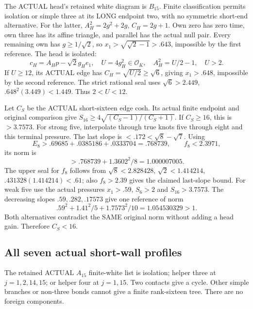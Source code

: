\documentclass[11pt]{article}
\begin{document}
The ACTUAL head's retained white diagram is \(B_{15}\).
Finite classification permits isolation or simple
three at its LONG endpoint two, with no symmetric
short-end alternative.
For the latter,
\(A_H^2=2g^2+2g\), \(C_H=2g+1\).
Own zero has zero time, own three has its affine
triangle, and parallel has the actual null pair.
Every remaining own has \(g\ge1/\sqrt2\), so
\(x_1>\sqrt{\sqrt2-1}>.643\), impossible by the
first reference.
The head is isolated:
\[
 c_H=A_Hp-\sqrt2g_He_1,\quad
 U=4g_H^2\in\mathcal O_K,\quad A_H^2=U/2-1,\quad U>2 .
\]
If \(U\ge12\), its ACTUAL edge has
\(C_H=\sqrt{U/2}\ge\sqrt6\), giving \(x_1>.648\),
impossible by the second reference.
The strict rational seal uses
\(\sqrt6>2.449\),
\(.648^2(3.449)<1.449\).
Thus \(2<U<12\).

Let \(C_S\) be the ACTUAL short-sixteen edge cosh.
Its actual finite endpoint and original comparison give
\(S_{16}\ge4\sqrt{(C_S-1)/(C_S+1)}\).
If \(C_S\ge16\), this is \(>3.7573\).
For strong five, interpolate through true knots
five through eight and this terminal pressure.
The last slope is \(<.172<\sqrt8-\sqrt7\).
Using
\[
 E_8>.69685+.0385186+.0333704=.768739,\qquad f_8<2.3971,
\]
its norm is
\[
                      >.768739+1.3602^2/8=1.000007005 .
\]
The upper seal for \(f_8\) follows from
\(\sqrt8<2.828428\), \(\sqrt2<1.414214\),
\(.431328(1.414214)<.61\); also \(f_8>2.39\)
gives the claimed last-slope bound.
For weak five use the actual pressures
\(x_1>.59\), \(S_6>2\) and \(S_{16}>3.7573\).
The decreasing slopes \(.59,.282,.17573\) give
one reference of norm
\[
                     .59^2+1.41^2/5+1.7573^2/10
                            =1.054530329>1 .
\]
Both alternatives contradict the SAME original
norm without adding a head gain.
Therefore \(C_S<16\).

\subsection{All seven actual short-wall profiles}
\label{app:arithB16shortwhite}

The retained ACTUAL \(A_{15}\) finite-white list is
isolation; helper three at \(j=1,2,14,15\);
or helper four at \(j=1,15\).
Two contacts give a cycle.
Other simple branches or non-three bonds cannot
give a finite rank-sixteen tree.
There are no foreign components.
\end{document}
